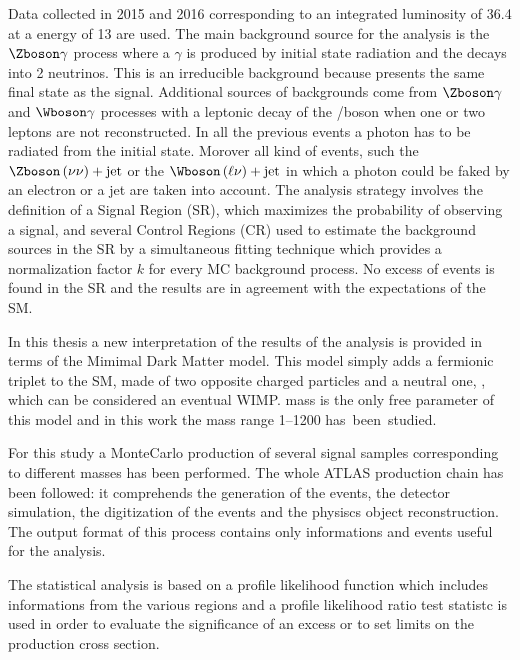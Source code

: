 Data collected in 2015 and 2016 corresponding to an integrated luminosity of \SI{36.4}{\ifb} at a \cm energy of \SI{13}{\tev} are used. The main background source for the \mph analysis is the $\Zboson\gamma$ process where a $\gamma$ is produced by initial state radiation and the \Zboson decays into 2 neutrinos. This is an irreducible background because presents the same final state as the signal. Additional sources of backgrounds come from $\Zboson\gamma$ and $\Wboson\gamma$ processes with a leptonic decay of the \Zboson/\Wboson boson when one or two leptons are not reconstructed. In all the previous events a photon has to be radiated from the initial state. Morover all kind of events, such the $\Zboson\left(\nu\nu\right)+\text{jet}$ or the $\Wboson\left(\ell\nu\right)+\text{jet}$ in which a photon could be faked by an electron or a jet are taken into account. The analysis strategy involves the definition of a Signal Region (SR), which maximizes the probability of observing a signal, and several Control Regions (CR) used to estimate the background sources in the SR by a simultaneous fitting technique which provides a normalization factor $k$ for every MC background process. No excess of events is found in the SR and the results are in agreement with the expectations of the SM.

In this thesis a new interpretation of the results of the \mph analysis is provided in terms of the Mimimal Dark Matter model. This model simply adds a fermionic triplet to the SM, made of two opposite charged particles \chipm and a neutral one, \chizero, which can be considered an eventual WIMP. \chizero mass is the only free parameter of this model and in this work the mass range \SIrange{1}{1200}{\gev} \mbox{has been studied}.
\enlargethispage{1\baselineskip}
  
For this study a MonteCarlo production of several signal samples corresponding to different \chizero masses has been performed. The whole ATLAS production chain has been followed: it comprehends the generation of the events, the detector simulation, the digitization of the events and the physiscs object reconstruction. The output format of this process contains only informations and events useful for the \mph analysis. 

The statistical analysis is based on a profile likelihood function which includes informations from the various regions and a profile likelihood ratio test statistc is used in order to evaluate the significance of an excess or to set limits on the production cross section.


